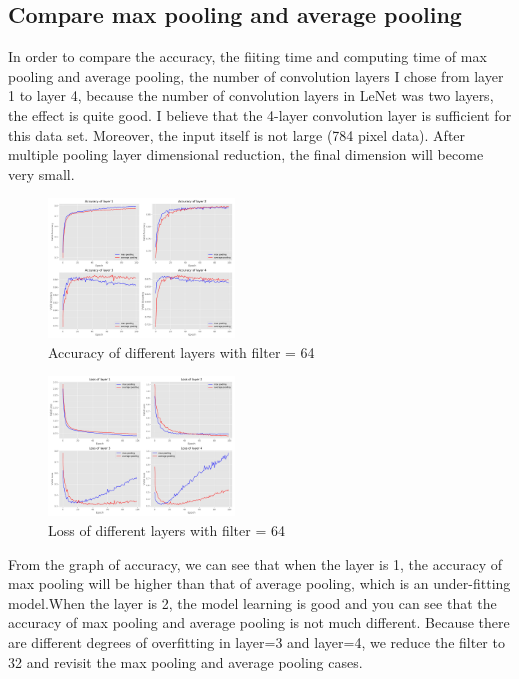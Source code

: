 \documentclass{article}
\begin{document}
\subsection{Compare max pooling and average pooling}
In order to compare the accuracy, the fiiting time and computing time of max pooling and average pooling, the number of convolution layers I chose from layer 1 to layer 4, because the number of convolution layers in LeNet was two layers, the effect is quite good. I believe that the 4-layer convolution layer is sufficient for this data set. Moreover, the input itself is not large (784 pixel data). After multiple pooling layer dimensional reduction, the final dimension will become very small.
\begin{figure}[H] %
	\centering %
	\includegraphics[width=0.44\textwidth]{./pic/part2/max_average_layer_acc.pdf} %
	\caption{Accuracy of different layers with filter = 64} %
	\label{Fig.main2} %
\end{figure}
\begin{figure}[H] %
	\centering %
	\includegraphics[width=0.44\textwidth]{./pic/part2/max_average_layer_loss.pdf} %
	\caption{Loss of different layers with filter = 64} %
	\label{Fig.main2} %
\end{figure}
From the graph of accuracy, we can see that when the layer is 1, the accuracy of max pooling will be higher than that of average pooling, which is an under-fitting model.When the layer is 2, the model learning is good and you can see that the accuracy of max pooling and average pooling is not much different. Because there are different degrees of overfitting in layer=3 and layer=4, we reduce the filter to 32 and revisit the max pooling and average pooling cases.
\end{document}
